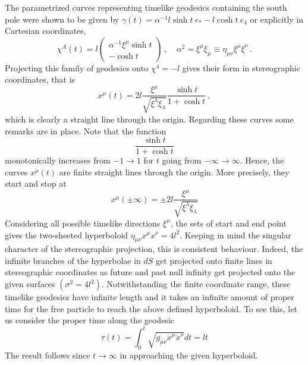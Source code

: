 \documentclass[11pt]{article}
\begin{document}
The parametrized curves representing timelike geodesics 
containing the south pole were shown to be given by $\gamma(t) = 
\alpha^{-1}l\sinh t~e_\ast - l\cosh t~e_4$ or explicitly in 
Cartesian coordinates,
%
\begin{displaymath}
	\chi^A(t) = l
	\begin{pmatrix}
		\alpha^{-1}\xi^\mu \sinh t \\
		-\cosh t
	\end{pmatrix}~,
	\quad \alpha^2 = \xi^\mu \xi_\mu \equiv \eta_{\mu\nu} \xi^\mu 
	\xi^\nu~.
\end{displaymath}
%
Projecting this family of geodesics onto $\chi^4 = -l$ gives 
their form in stereographic coordinates, that is
%
\begin{equation}
	x^\mu(t) = 2l \frac{\xi^\mu}{\sqrt{\xi^\lambda\xi_\lambda}}
	\frac{\sinh t}{1 + \cosh t}~,
\end{equation}
which is clearly a straight line through the origin.  Regarding 
these curves some remarks are in place. Note that the function
%
\begin{displaymath}
	\frac{\sinh t}{1 + \cosh t}
\end{displaymath}
monotonically increases from $-1 \to 1$ for $t$ going from 
$-\infty \to \infty$. Hence, the curves $x^\mu(t)$ are finite 
straight lines through the origin. More precisely, they start and 
stop at
%
\begin{displaymath}
	x^\mu(\pm \infty) = \pm 2l \frac{\xi^\mu}{\sqrt{\xi^\lambda 
			\xi_\lambda}}
\end{displaymath}
Considering all possible timelike directions $\xi^\mu$, the sets 
of start and end point gives the two-sheeted hyperboloid 
$\eta_{\mu\nu} x^\mu x^\nu = 4l^2$. Keeping in mind the singular 
character of the stereographic projection, this is consistent 
behaviour.  Indeed, the infinite branches of the hyperbolae in 
$dS$ get projected onto finite lines in stereographic coordinates 
as future and past null infinity get projected onto the given 
surfaces $(\sigma^2 = 4l^2)$.  Notwithstanding the finite 
coordinate range, these timelike geodesics have infinite length 
and it takes an infinite amount of proper time for the free 
particle to reach the above defined hyperboloid. To see this, let 
us consider the proper time along the geodesic
%
\begin{displaymath}
	\tau(t) = \int_0^t \sqrt{g_{\mu\nu} \dot{x}^\mu \dot{x}^\nu} dt 
	= lt
\end{displaymath}
The result follows since $t \to \infty$ in approaching the given 
hyperboloid.
\end{document}

